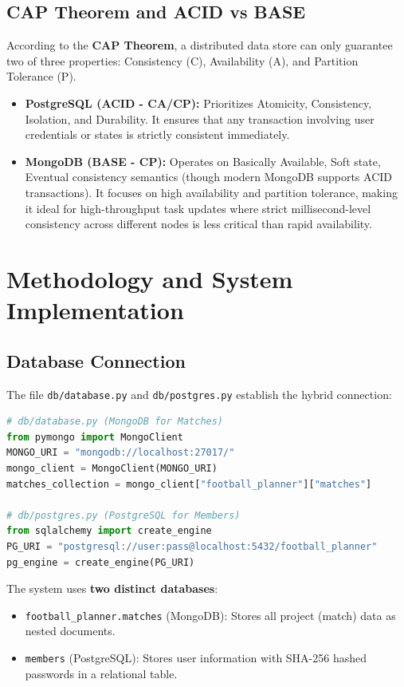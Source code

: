 \documentclass[a4paper,12pt]{article}
\begin{document}
\subsection{CAP Theorem and ACID vs BASE}
According to the \textbf{CAP Theorem}, a distributed data store can only guarantee two of three properties: Consistency (C), Availability (A), and Partition Tolerance (P).
\begin{itemize}
    \item \textbf{PostgreSQL (ACID - CA/CP):} Prioritizes Atomicity, Consistency, Isolation, and Durability. It ensures that any transaction involving user credentials or states is strictly consistent immediately.
    \item \textbf{MongoDB (BASE - CP):} Operates on Basically Available, Soft state, Eventual consistency semantics (though modern MongoDB supports ACID transactions). It focuses on high availability and partition tolerance, making it ideal for high-throughput task updates where strict millisecond-level consistency across different nodes is less critical than rapid availability.
\end{itemize}

\section{Methodology and System Implementation}

\subsection{Database Connection}

The file \texttt{db/database.py} and \texttt{db/postgres.py} establish the hybrid connection:

\begin{lstlisting}[language=Python, caption=Hybrid Connection Setup]
# db/database.py (MongoDB for Matches)
from pymongo import MongoClient
MONGO_URI = "mongodb://localhost:27017/"
mongo_client = MongoClient(MONGO_URI)
matches_collection = mongo_client["football_planner"]["matches"]

# db/postgres.py (PostgreSQL for Members)
from sqlalchemy import create_engine
PG_URI = "postgresql://user:pass@localhost:5432/football_planner"
pg_engine = create_engine(PG_URI)
\end{lstlisting}

The system uses \textbf{two distinct databases}:
\begin{itemize}
    \item \texttt{football\_planner.matches} (MongoDB): Stores all project (match) data as nested documents.
    \item \texttt{members} (PostgreSQL): Stores user information with SHA-256 hashed passwords in a relational table.
\end{itemize}
\end{document}
